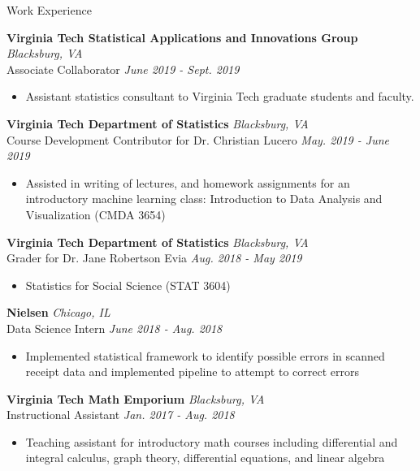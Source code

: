\documentclass{resume} %
\begin{document}
\begin{rSection}{Work Experience}

{\bf Virginia Tech Statistical Applications and Innovations Group} \hfill {\em Blacksburg, VA} \\
{Associate Collaborator} \hfill {\em June 2019 - Sept. 2019}
\begin{itemize}
    \item Assistant statistics consultant to Virginia Tech graduate students and faculty.
\end{itemize}

{\bf Virginia Tech Department of Statistics} \hfill {\em Blacksburg, VA} \\
{Course Development Contributor for Dr. Christian Lucero} \hfill {\em May. 2019 - June 2019}
\begin{itemize}
    \item Assisted in writing of lectures, and homework assignments for an introductory machine learning class: Introduction to Data Analysis and Visualization (CMDA 3654)
\end{itemize}

{\bf Virginia Tech Department of Statistics} \hfill {\em Blacksburg, VA} \\
{Grader for Dr. Jane Robertson Evia} \hfill {\em Aug. 2018 - May 2019}
\begin{itemize}
    \item Statistics for Social Science (STAT 3604)
\end{itemize}

{\bf Nielsen} \hfill {\em Chicago, IL} \\
{Data Science Intern} \hfill {\em June 2018 - Aug. 2018}
\begin{itemize}
    \item Implemented statistical framework to identify possible errors in scanned receipt data and implemented pipeline to attempt to correct errors
    \end{itemize}

{\bf Virginia Tech Math Emporium} \hfill {\em Blacksburg, VA} \\
{Instructional Assistant} \hfill {\em Jan. 2017 - Aug. 2018}
\begin{itemize}
    \item Teaching assistant for introductory math courses including differential and integral calculus, graph theory, differential equations, and linear algebra
\end{itemize}
\end{rSection}
\end{document}
